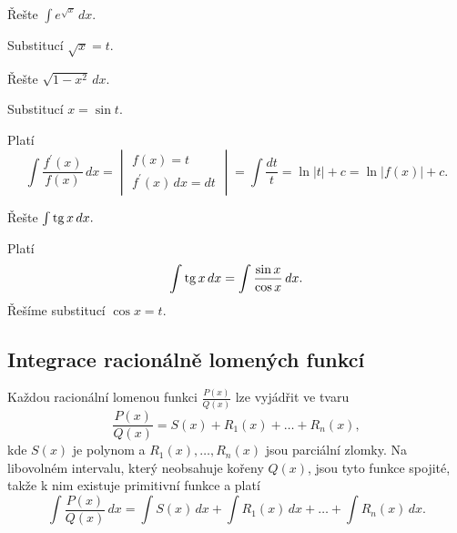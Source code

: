 \begin{priklad}
Řešte $\int e^{\sqrt{x} }\, dx$.
\end{priklad}

\begin{reseni}
Substitucí $\sqrt{x}=t $.
\end{reseni}

\begin{priklad}
Řešte $\sqrt{1-x^2}\, dx.$
\end{priklad}

\begin{reseni}
Substitucí $x=\sin t$.
\end{reseni}

\begin{pozn}
    Platí
    $$\int \frac{f^\prime(x)}{f(x)}\, dx=\begin{vmatrix}
        f(x)=t \\
        f^\prime(x) \, dx = dt
    \end{vmatrix}=\int \frac{dt}{t}=\ln |t|+c=\ln |f(x)|+c.$$
\end{pozn}

\begin{priklad}
Řešte $\int \operatorname{tg} x\, dx.$
\end{priklad}

\begin{reseni}
Platí
$$\int \operatorname{tg} x\, dx=\int \frac{\sin x}{\cos x}\, dx.$$
Řešíme substitucí $\cos x=t.$
\end{reseni}

\subsection*{Integrace racionálně lomených funkcí}
\begin{pozn}
    Každou racionální lomenou funkci $\frac{P(x)}{Q(x)}$ lze vyjádřit ve tvaru
    $$\frac{P(x)}{Q(x)}=S(x)+R_1(x)+\dots+R_n(x),$$
    kde $S(x)$ je polynom a $R_1(x),\dots,R_n(x)$ jsou parciální zlomky.
    Na libovolném intervalu, který neobsahuje kořeny $Q(x)$, jsou tyto funkce spojité,
    takže k nim existuje primitivní funkce a platí
    $$\int \frac{P(x)}{Q(x)} \, dx=\int S(x)\, dx + \int R_1(x)\, dx + \dots + \int R_n(x)\, dx.$$
\end{pozn}

